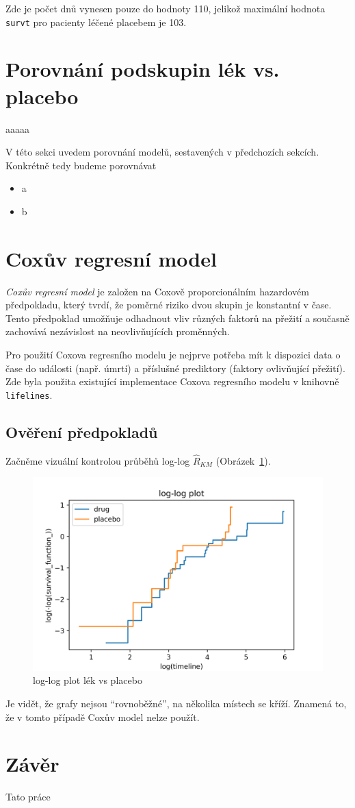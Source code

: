 \documentclass[a4, 11pt]{article}
\newcommand{\uvoz}[1]{``{#1}''}                        %
\theoremstyle{definition}
\theoremstyle{remark}
\begin{document}
	Zde je počet dnů vynesen pouze do hodnoty 110, jelikož maximální hodnota \texttt{survt} pro pacienty léčené placebem je 103.
	
	
	\section{Porovnání podskupin lék vs. placebo} \label{sec:comparison_drug_vs_placebo}
	aaaaa
	
	V této sekci uvedem porovnání modelů, sestavených v předchozích sekcích. Konkrétně tedy budeme porovnávat 
	\begin{itemize}
		\item a
		\item b
	\end{itemize}

	
	
	\newpage
	\section{Coxův regresní model} \label{sec:cox_model}
	\textit{Coxův regresní model} je založen na Coxově proporcionálním hazardovém předpokladu, který tvrdí, že poměrné riziko dvou skupin je konstantní v čase. Tento předpoklad umožňuje odhadnout vliv různých faktorů na přežití a současně zachovává nezávislost na neovlivňujících proměnných.
	
	Pro použití Coxova regresního modelu je nejprve potřeba mít k dispozici data o čase do události (např. úmrtí) a příslušné prediktory (faktory ovlivňující přežití). Zde byla použita existující implementace Coxova regresního modelu v knihovně \texttt{lifelines}.
	
	\subsection{Ověření předpokladů}
	Začněme vizuální kontrolou průběhů log-log $ \hat{R}_{KM} $ (Obrázek~\ref{fig:loglogplot_drug_vs_placebo}).
	 
	\begin{figure}[H]
		\centering
		\includegraphics[width=0.6\linewidth]{img/loglogplot_KM.png}
	 	\caption{log-log plot lék vs placebo}
	 	\label{fig:loglogplot_drug_vs_placebo}
	\end{figure}
	
	Je vidět, že grafy nejsou \uvoz{rovnoběžné}, na několika místech se kříží. 
    Znamená to, že v tomto případě Coxův model nelze použít. 

	
	\newpage
	\section{Závěr}\label{sec:zaver}
	Tato práce 
\end{document}
